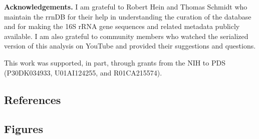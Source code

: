 \documentclass[
]{article}
\begin{document}
\textbf{Acknowledgements.} I am grateful to Robert Hein and Thomas
Schmidt who maintain the rrnDB for their help in understanding the
curation of the database and for making the 16S rRNA gene sequences and
related metadata publicly available. I am also grateful to community
members who watched the serialized version of this analysis on YouTube
and provided their suggestions and questions.

This work was supported, in part, through grants from the NIH to PDS
(P30DK034933, U01AI124255, and R01CA215574).

\newpage

\hypertarget{references}{%
\subsection{References}\label{references}}

\newpage

\hypertarget{figures}{%
\subsection{Figures}\label{figures}}
\end{document}
